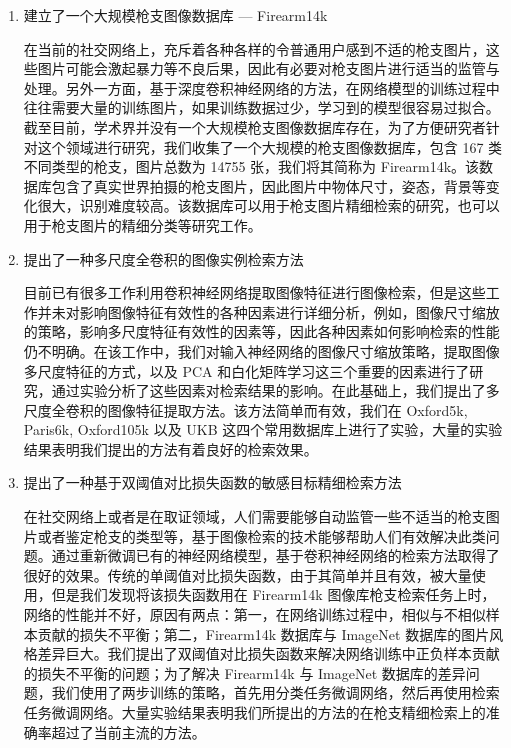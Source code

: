 \begin{enumerate}
\item 建立了一个大规模枪支图像数据库 --- Firearm14k

在当前的社交网络上，充斥着各种各样的令普通用户感到不适的枪支图片，这些图片可能会激起暴力等不良后果，因此有必要对枪支图片进行适当的监管与处理。另外一方面，基于深度卷积神经网络的方法，在网络模型的训练过程中往往需要大量的训练图片，如果训练数据过少，学习到的模型很容易过拟合。截至目前，学术界并没有一个大规模枪支图像数据库存在，为了方便研究者针对这个领域进行研究，我们收集了一个大规模的枪支图像数据库，包含 167 类不同类型的枪支，图片总数为 14755 张，我们将其简称为 Firearm14k。该数据库包含了真实世界拍摄的枪支图片，因此图片中物体尺寸，姿态，背景等变化很大，识别难度较高。该数据库可以用于枪支图片精细检索的研究，也可以用于枪支图片的精细分类等研究工作。

\item 提出了一种多尺度全卷积的图像实例检索方法

目前已有很多工作利用卷积神经网络提取图像特征进行图像检索，但是这些工作并未对影响图像特征有效性的各种因素进行详细分析，例如，图像尺寸缩放的策略，影响多尺度特征有效性的因素等，因此各种因素如何影响检索的性能仍不明确。在该工作中，我们对输入神经网络的图像尺寸缩放策略，提取图像多尺度特征的方式，以及 PCA 和白化矩阵学习这三个重要的因素进行了研究，通过实验分析了这些因素对检索结果的影响。在此基础上，我们提出了多尺度全卷积的图像特征提取方法。该方法简单而有效，我们在 Oxford5k, Paris6k, Oxford105k 以及 UKB 这四个常用数据库上进行了实验，大量的实验结果表明我们提出的方法有着良好的检索效果。

\item 提出了一种基于双阈值对比损失函数的敏感目标精细检索方法

在社交网络上或者是在取证领域，人们需要能够自动监管一些不适当的枪支图片或者鉴定枪支的类型等，基于图像检索的技术能够帮助人们有效解决此类问题。通过重新微调已有的神经网络模型，基于卷积神经网络的检索方法取得了很好的效果。传统的单阈值对比损失函数，由于其简单并且有效，被大量使用，但是我们发现将该损失函数用在 Firearm14k 图像库枪支检索任务上时，网络的性能并不好，原因有两点：第一，在网络训练过程中，相似与不相似样本贡献的损失不平衡；第二，Firearm14k 数据库与 ImageNet 数据库的图片风格差异巨大。我们提出了双阈值对比损失函数来解决网络训练中正负样本贡献的损失不平衡的问题；为了解决 Firearm14k 与 ImageNet 数据库的差异问题，我们使用了两步训练的策略，首先用分类任务微调网络，然后再使用检索任务微调网络。大量实验结果表明我们所提出的方法的在枪支精细检索上的准确率超过了当前主流的方法。

\end{enumerate}
